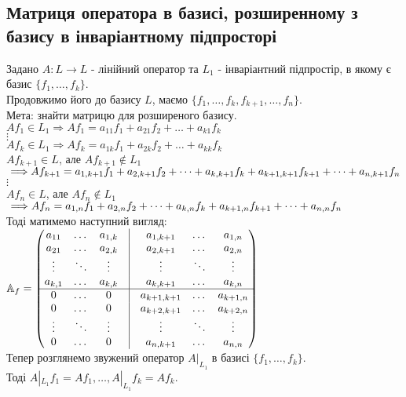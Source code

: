\documentclass[a4paper, 10pt]{article}
\theoremstyle{theoremdd}
\begin{document}
\subsection{Матриця оператора в базисі, розширенному з базису в інваріантному підпросторі}
Задано $A \colon L \to L$ - лінійний оператор та $L_1$ - інваріантний підпростір, в якому є базис $\{f_1,\dots, f_k\}$.\\
Продовжимо його до базису $L$, маємо $\{f_1,\dots,f_k,f_{k+1},\dots,f_n\}$. \\
Мета: знайти матрицю для розширеного базису.\\
$Af_1 \in L_1 \Rightarrow Af_1 = a_{11}f_1 + a_{21}f_2 + \dots + a_{k1}f_k$\\
$\vdots$\\
$Af_k \in L_1 \Rightarrow Af_k = a_{1k}f_1 + a_{2k}f_2 + \dots + a_{kk}f_k$\\
$Af_{k+1} \in L $, але $Af_{k+1} \notin L_1$ $\implies \\ Af_{k+1} = a_{1,k+1}f_1 + a_{2,k+1}f_2 + \dots + a_{k,k+1}f_k + a_{k+1,k+1}f_{k+1} + \dots + a_{n,k+1}f_n$\\
$\vdots$\\
$Af_n \in L $, але $Af_n \notin L_1$ $\implies \\ Af_n = a_{1,n}f_1 + a_{2,n}f_2 + \dots + a_{k,n}f_k + a_{k+1,n}f_{k+1} + \dots + a_{n,n}f_n$\\
Тоді матимемо наступний вигляд:\\
$\mathbb{A}_f = \begin{pmatrix}
a_{11} & \dots & a_{1,k} & \vline & a_{1,k+1} & \dots & a_{1, n} \\
a_{21} & \dots & a_{2,k} & \vline & a_{2,k+1} & \dots & a_{2, n} \\
\vdots & \ddots & \vdots & \vline & \vdots & \ddots & \vdots \\
a_{k,1} & \dots & a_{k,k} & \vline & a_{k,k+1} & \dots & a_{k, n} \\
\hline
0 & \dots & 0 & \vline & a_{k+1,k+1} & \dots & a_{k+1, n} \\
0 & \dots & 0 & \vline & a_{k+2,k+1} &  \dots & a_{k+2, n} \\
\vdots & \ddots & \vdots & \vline & \vdots & \ddots & \vdots \\
0 & \dots & 0 & \vline & a_{n,k+1} & \dots & a_{n, n} \\
\end{pmatrix}$
\bigskip \\
Тепер розглянемо звужений оператор $A|_{L_1}$ в базисі $\{f_1,\dots,f_k\}$.\\ Тоді $A|_{L_1} f_1 = Af_1 , \dots, A|_{L_1}f_k = Af_k$.\\
\end{document}
